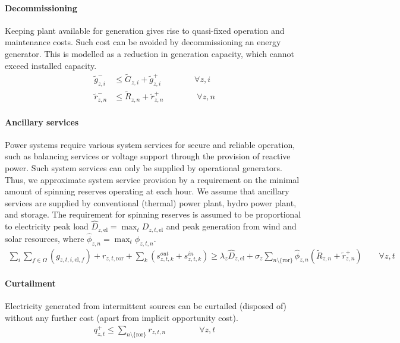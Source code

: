 \documentclass[review, 3p, times, 12pt, authoryear]{elsarticle}
\begin{document}
    \paragraph{Decommissioning}
    Keeping plant available for generation gives rise to quasi-fixed operation and maintenance costs.
    Such cost can be avoided by decommissioning an energy generator. This is modelled as a reduction in generation
    capacity, which cannot exceed installed capacity.
    \begin{align}
        \widetilde{g}^{-}_{z,i} &\leq \widetilde{G}_{z,i} + \widetilde{g}^{+}_{z,i}\qquad \qquad \forall z,i\\
        \widetilde{r}^{-}_{z,n} &\leq \widetilde{R}_{z,n} +\widetilde{r}^{+}_{z,n}\qquad \qquad \forall z,n
    \end{align}

    \paragraph{Ancillary services}
    Power systems require various system services for secure and reliable operation, such as balancing services or
    voltage support through the provision of reactive power. Such system services can only be supplied by operational
    generators.
    Thus, we approximate system service provision by a requirement on the minimal amount of spinning reserves operating
    at each hour.
    We assume that ancillary services are supplied by conventional (thermal) power plant, hydro power plant, and storage.
    The requirement for spinning reserves is assumed to be proportional to electricity peak load
    $\widehat{D}_{z,\text{el}} = \max_{t} D_{z,t,\text{el}}$ and peak generation from wind and solar resources,
    where $\widehat{\phi}_{z,n} = \max_{t} \phi_{z,t,n}$.
    \begin{align}
        \sum_{i}\sum_{f \in \Omega}\left( g_{z,t,i,\text{el},f}\right) + r_{z,t,\text{ror}}
        + \sum_{k}\left( s^{out}_{z,t,k} + s^{in}_{z,t,k}\right)\geq \lambda_{z}\widehat{D}_{z,\text{el}}
        + \sigma_{z}\sum_{n\setminus \{ \text{ror}\}}\widehat{\phi}_{z,n} (\widetilde{R}_{z,n}
        +\widetilde{r}^{+}_{z,n})\qquad \forall z,t
    \end{align}

    \paragraph{Curtailment}
    Electricity generated from intermittent sources can be curtailed (disposed of) without any further cost (apart from
    implicit opportunity cost).
    \begin{align}
        q^{+}_{z,t} \leq \sum_{n\setminus \{ \text{ror}\}} r_{z,t,n} \qquad \qquad \forall z, t
    \end{align}
\end{document}
